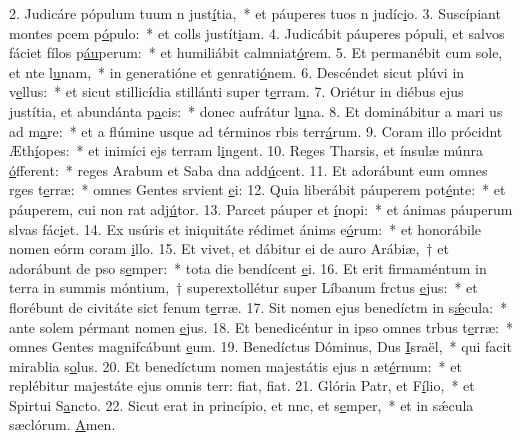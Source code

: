 2. Judicáre pópulum tuum n just\uline{í}tia,~* et páuperes tuos n judíc\uline{i}o.
3. Suscípiant montes pcem p\uline{ó}pulo:~* et colls justít\uline{i}am.
4. Judicábit páuperes pópuli, et salvos fáciet fílos p\uline{áu}perum:~* et humiliábit calmniat\uline{ó}rem.
5. Et permanébit cum sole, et nte l\uline{u}nam,~* in generatióne et genrati\uline{ó}nem.
6. Descéndet sicut plúvi in v\uline{e}llus:~* et sicut stillicídia stillánti super t\uline{e}rram.
7. Oriétur in diébus ejus justítia, et abundánta p\uline{a}cis:~* donec aufrátur l\uline{u}na.
8. Et dominábitur a mari us ad m\uline{a}re:~* et a flúmine usque ad términos rbis terr\uline{á}rum.
9. Coram illo prócidnt Æth\uline{í}opes:~* et inimíci ejs terram l\uline{i}ngent.
10. Reges Tharsis, et ínsulæ múnra \uline{ó}fferent:~* reges Arabum et Saba dna add\uline{ú}cent.
11. Et adorábunt eum omnes rges t\uline{e}rræ:~* omnes Gentes srvient \uline{e}i:
12. Quia liberábit páuperem  pot\uline{é}nte:~* et páuperem, cui non rat adj\uline{ú}tor.
13. Parcet páuper et \uline{í}nopi:~* et ánimas páuperum slvas fác\uline{i}et.
14. Ex usúris et iniquitáte rédimet ánims e\uline{ó}rum:~* et honorábile nomen eórm coram \uline{i}llo.
15. Et vivet, et dábitur ei de auro Arábiæ,~† et adorábunt de pso s\uline{e}mper:~* tota die bendícent \uline{e}i.
16. Et erit firmaméntum in terra in summis móntium,~† superextollétur super Líbanum frctus \uline{e}jus:~* et florébunt de civitáte sict fenum t\uline{e}rræ.
17. Sit nomen ejus benedíctm in s\uline{ǽ}cula:~* ante solem pérmant nomen \uline{e}jus.
18. Et benedicéntur in ipso omnes trbus t\uline{e}rræ:~* omnes Gentes magnifcábunt \uline{e}um.
19. Benedíctus Dóminus, Dus \uline{I}sraël,~* qui facit mirablia s\uline{o}lus.
20. Et benedíctum nomen majestátis ejus n æt\uline{é}rnum:~* et replébitur majestáte ejus omnis terr: fiat, f\uline{i}at.
21. Glória Patr, et F\uline{í}lio,~* et Spirtui S\uline{a}ncto.
22. Sicut erat in princípio, et nnc, et s\uline{e}mper,~* et in sǽcula sæclórum. \uline{A}men.

